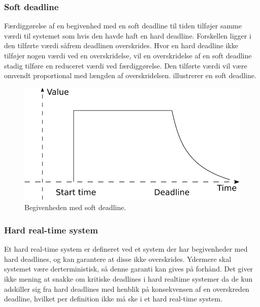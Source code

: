 \subsubsection{Soft deadline}
Færdiggørelse af en begivenhed med en soft deadline til tiden tilføjer samme værdi til systemet som hvis den havde haft en hard deadline. Forskellen ligger i den tilførte værdi såfrem deadlinen overskrides. Hvor en hard deadline ikke tilføjer nogen værdi ved en overskridelse, vil en overskridelse af en soft deadline stadig tilføre en reduceret værdi ved færdiggørelse. Den tilførte værdi vil være omvendt proportional med længden af overskridelsen.  illustrerer en soft deadline. 

\begin{figure}
 \begin{center}
  \includegraphics[scale=0.75]{images/soft-deadline}
	\caption{Begivenheden med soft deadline.}
	\label{figure:soft-dl}
\end{center}
\end{figure}



\subsubsection{Hard real-time system}
Et hard real-time system er defineret ved et system der har begivenheder med hard deadlines, og kan garantere at disse ikke overskrides. Ydermere skal systemet være derterministisk, så denne garanti kan gives på forhånd. Det giver ikke mening at snakke om kritiske deadlines i hard realtime systemer da de kun adskiller sig fra hard deadlines med henblik på konsekvensen af en overskreden deadline, hvilket per definition ikke må ske i et hard real-time system.  

